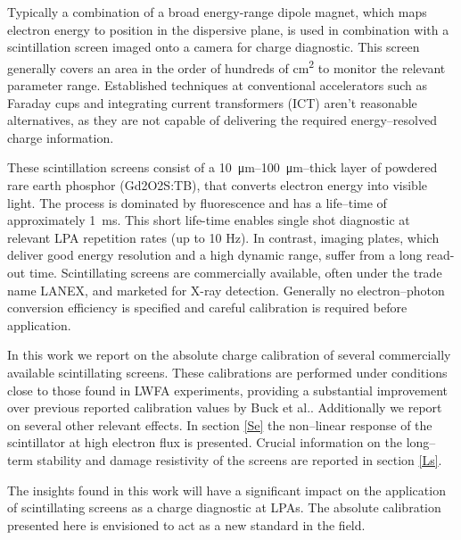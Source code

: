 \documentclass[%
preprint,
amsmath,
amssymb,
aip,
rsi, 
numerical,
floatfix,
]{revtex4-1}
\newcommand{\myCite}[1]{\textcolor{blue}{\cite{#1}}}
\begin{document}
Typically a combination of a broad energy-range dipole magnet, which maps electron energy to position in the dispersive plane, is used in combination with a scintillation screen imaged onto a camera for charge diagnostic. 
This screen generally covers an area in the order of hundreds of \si{\centi\metre^2} to monitor the relevant parameter range. 
Established techniques at conventional accelerators such as Faraday cups and integrating current transformers (ICT) aren't reasonable alternatives, as they are not capable of delivering the required energy--resolved charge information.

These scintillation screens consist of a \SIrange{10}{100}{\micro\meter}--thick layer of powdered rare earth phosphor (Gd2O2S:TB), that converts electron energy into visible light. 
The process is dominated by fluorescence and has a life--time of approximately \SI{1}{\milli\second}. 
This short life-time enables single shot diagnostic at relevant LPA repetition rates (up to 10 Hz). 
In contrast, imaging plates, which deliver good energy resolution and a high dynamic range\myCite{Tanaka2005,Masuda2008,Zeil2010,Bonnet2013}, suffer from a long read-out time.
Scintillating screens are commercially available, often under the trade name LANEX, and marketed for X-ray detection. 
Generally no electron--photon conversion efficiency is specified and careful calibration is required before application.

In this work we report on the absolute charge calibration of several commercially available scintillating screens. 
These calibrations are performed under conditions close to those found in LWFA experiments, providing a substantial improvement over previous reported calibration values by Buck et al.\myCite{Buck2010}.
Additionally we report on several other relevant effects. 
In section \ref{Se} the non--linear response of the scintillator at high electron flux is presented. 
Crucial information on the long--term stability and damage resistivity of the screens are reported in section \ref{Ls}.

The insights found in this work will have a significant impact on the application of scintillating screens as a charge diagnostic at LPAs. 
The absolute calibration presented here is envisioned to act as a new standard in the field.  
\end{document}
